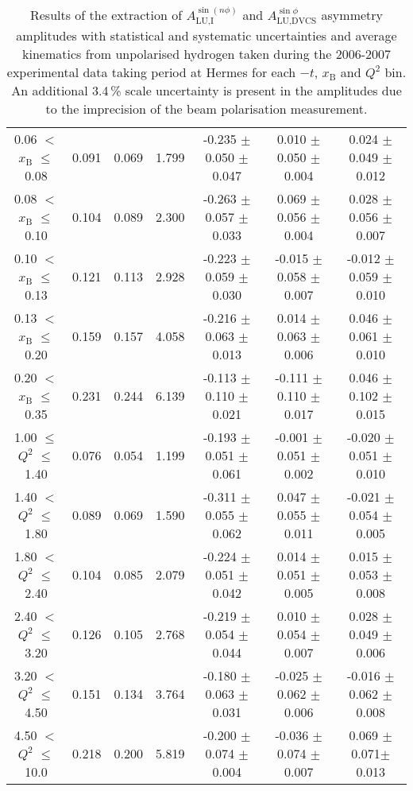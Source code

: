 \begin{table}[width=15cm]
\begin{center}
{\begin{tabular}{|c|c|c|c|c|c|c|}
0.06 $<$ $x_{\textrm{B}}$ $\leqslant$ 0.08 &  0.091 & 0.069 &  1.799 &  -0.235  $\pm$  0.050  $\pm$   0.047 &
0.010 $\pm$  0.050  $\pm$   0.004 & 0.024 $\pm$   0.049  $\pm$   0.012\\
0.08 $<$ $x_{\textrm{B}}$ $\leqslant$ 0.10 &  0.104 & 0.089 &  2.300 &  -0.263 $\pm$  0.057  $\pm$   0.033 &
0.069 $\pm$   0.056  $\pm$   0.004 & 0.028  $\pm$  0.056  $\pm$   0.007\\
0.10 $<$ $x_{\textrm{B}}$ $\leqslant$ 0.13 &  0.121 &  0.113 &  2.928 &  -0.223  $\pm$  0.059   $\pm$  0.030 & 
-0.015  $\pm$  0.058  $\pm$   0.007 & -0.012  $\pm$  0.059  $\pm$   0.010\\
0.13 $<$ $x_{\textrm{B}}$ $\leqslant$ 0.20 &  0.159 & 0.157 &  4.058&  -0.216  $\pm$  0.063  $\pm$   0.013 &
0.014  $\pm$  0.063  $\pm$   0.006 & 0.046  $\pm$  0.061  $\pm$   0.010 \\
0.20 $<$ $x_{\textrm{B}}$ $\leqslant$ 0.35 &  0.231 & 0.244 &  6.139 &  -0.113 $\pm$ 0.110  $\pm$   0.021 &
-0.111  $\pm$  0.110 $\pm$    0.017 & 0.046  $\pm$  0.102  $\pm$  0.015\\
\hline
1.00 $\leqslant$ $Q^{2}$ $\leqslant$ 1.40 &  0.076 & 0.054  & 1.199 &  -0.193  $\pm$  0.051  $\pm$   0.061 &
-0.001 $\pm$   0.051  $\pm$   0.002 & -0.020  $\pm$  0.051   $\pm$  0.010 \\
1.40 $<$ $Q^{2}$ $\leqslant$ 1.80 &  0.089 & 0.069 &  1.590 &  -0.311 $\pm$  0.055  $\pm$   0.062 &
0.047  $\pm$  0.055  $\pm$   0.011 & -0.021 $\pm$   0.054  $\pm$   0.005\\
1.80 $<$ $Q^{2}$ $\leqslant$ 2.40 &  0.104 & 0.085 &  2.079 &  -0.224 $\pm$   0.051  $\pm$   0.042 &
0.014 $\pm$   0.051  $\pm$   0.005 & 0.015  $\pm$  0.053  $\pm$   0.008\\
2.40 $<$ $Q^{2}$ $\leqslant$ 3.20 &  0.126 & 0.105  & 2.768 &  -0.219 $\pm$   0.054  $\pm$   0.044 &
0.010  $\pm$  0.054 $\pm$    0.007 & 0.028   $\pm$ 0.049  $\pm$   0.006\\
3.20 $<$ $Q^{2}$ $\leqslant$ 4.50 &  0.151 & 0.134 &  3.764 &  -0.180 $\pm$   0.063  $\pm$   0.031 &
-0.025  $\pm$  0.062 $\pm$    0.006 & -0.016 $\pm$   0.062  $\pm$   0.008\\
4.50 $<$ $Q^{2}$ $\leqslant$ 10.0 &  0.218 & 0.200 &  5.819 &  -0.200  $\pm$  0.074 $\pm$    0.004 &
-0.036  $\pm$  0.074  $\pm$   0.007 & 0.069 $\pm$  0.071$ \pm$  0.013\\
\hline
  \end{tabular}
}
 \end{center}
\caption{Results of the extraction of $A_{\textrm{LU,I}}^{\sin(n\phi)}$ and $A_{\textrm{LU,DVCS}}^{\sin \phi}$ asymmetry amplitudes with statistical and systematic uncertainties and average kinematics from unpolarised hydrogen taken during
the 2006-2007 experimental data taking period at H{\sc ermes} for each $-t$, $x_{\textrm{B}}$ and $Q^{2}$ bin.
An additional 3.4\,\% scale uncertainty is present in the amplitudes due to the imprecision of
the beam polarisation measurement.}
\end{table}

